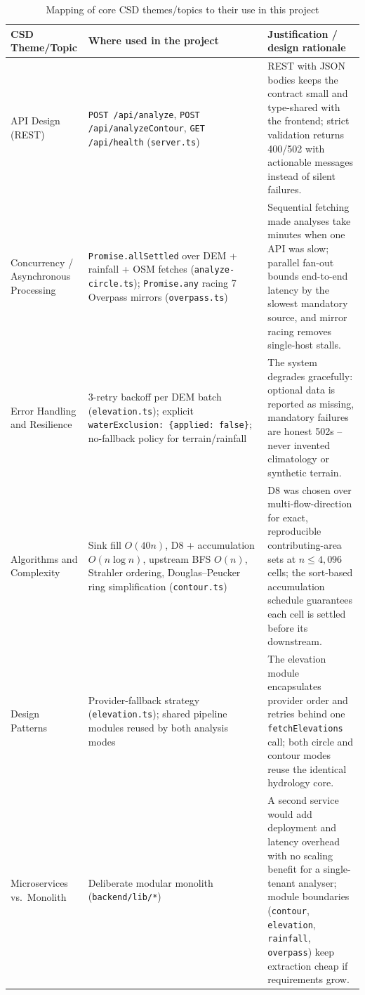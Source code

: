 \documentclass[manuscript,screen,review]{acmart}
\begin{document}
\begin{table}[t]
  \caption{Mapping of core CSD themes/topics to their use in this project}
  \label{tab:csd-themes}
  \begin{tabular}{p{2.2cm}p{4.0cm}p{5.6cm}}
    \toprule
    CSD Theme/Topic & Where used in the project & Justification / design rationale \\
    \midrule
    API Design (REST) & \texttt{POST /api/analyze}, \texttt{POST /api/analyzeContour}, \texttt{GET /api/health} (\texttt{server.ts}) & REST with JSON bodies keeps the contract small and type-shared with the frontend; strict validation returns 400/502 with actionable messages instead of silent failures. \\
    Concurrency / Asynchronous Processing & \texttt{Promise.allSettled} over DEM + rainfall + OSM fetches (\texttt{analyze-circle.ts}); \texttt{Promise.any} racing 7 Overpass mirrors (\texttt{overpass.ts}) & Sequential fetching made analyses take minutes when one API was slow; parallel fan-out bounds end-to-end latency by the slowest mandatory source, and mirror racing removes single-host stalls. \\
    Error Handling and Resilience & 3-retry backoff per DEM batch (\texttt{elevation.ts}); explicit \texttt{waterExclusion:\ \{applied:\ false\}}; no-fallback policy for terrain/rainfall & The system degrades gracefully: optional data is reported as missing, mandatory failures are honest 502s -- never invented climatology or synthetic terrain. \\
    Algorithms and Complexity & Sink fill $O(40n)$, D8 + accumulation $O(n \log n)$, upstream BFS $O(n)$, Strahler ordering, Douglas--Peucker ring simplification (\texttt{contour.ts}) & D8 was chosen over multi-flow-direction for exact, reproducible contributing-area sets at $n \le 4{,}096$ cells; the sort-based accumulation schedule guarantees each cell is settled before its downstream. \\
    Design Patterns & Provider-fallback strategy (\texttt{elevation.ts}); shared pipeline modules reused by both analysis modes & The elevation module encapsulates provider order and retries behind one \texttt{fetchElevations} call; both circle and contour modes reuse the identical hydrology core. \\
    Microservices vs.\ Monolith & Deliberate modular monolith (\texttt{backend/lib/*}) & A second service would add deployment and latency overhead with no scaling benefit for a single-tenant analyser; module boundaries (\texttt{contour}, \texttt{elevation}, \texttt{rainfall}, \texttt{overpass}) keep extraction cheap if requirements grow. \\

\end{tabular}
\end{table}
\end{document}
